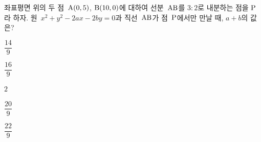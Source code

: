 좌표평면 위의 두 점~$\mathrm{A}(0{,}\mkern3mu 5)$, $\mathrm{B}(10{,}\mkern3mu 0)$에 대하여 선분~$\mathrm{AB}$를 $3:2$로 내분하는 점을 $\mathrm{P}$라 하자. 원~$x^2+y^2-2ax-2by=0$과 직선~$\mathrm{AB}$가 점~$\mathrm{P}$에서만 만날 때, $a+b$의 값은? 
\begin{choices32}{\rule[-3ex]{0pt}{8ex}$\dfrac{14}{9}$}{\rule[-3ex]{0pt}{8ex}$\dfrac{16}{9}$}{\rule[-3ex]{0pt}{8ex}$2$}{\rule[-3ex]{0pt}{8ex}$\dfrac{20}{9}$}{\rule[-3ex]{0pt}{8ex}$\dfrac{22}{9}$}\end{choices32}
